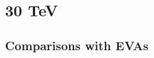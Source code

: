 \documentclass[a4paper,11pt]{article}
\begin{document}
\clearpage
\subsection{30 TeV}



\clearpage
\subsubsection{Comparisons with EVAs}




\end{document}
